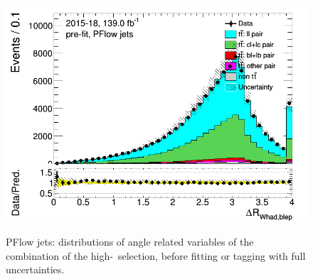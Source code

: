 \begin{figure}[H]
\includegraphics[width=.45\textwidth]{FTAG_plots/pretagNoRwnewonlyPFlowall/DataMC_h_dRWhadblep.png} \\
\caption{PFlow jets: distributions of angle related variables of the combination of the high-\pt\ selection,
 before fitting or 
tagging with full uncertainties.} \label{fig:highpT_angles_PFlow}
\end{figure}

